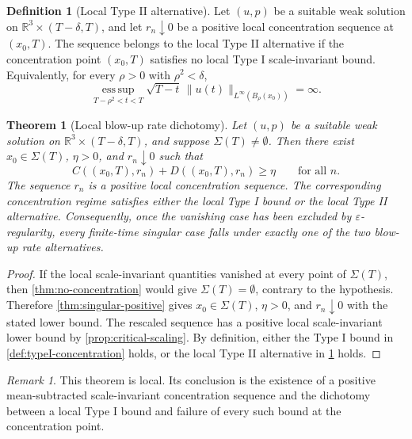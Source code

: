 \documentclass[11pt]{amsart}
\theoremstyle{plain}
\newtheorem{theorem}{Theorem}[section]
\theoremstyle{definition}
\newtheorem{definition}[definition]{Definition}
\theoremstyle{remark}
\newtheorem{remark}[remark]{Remark}
\begin{document}
\begin{definition}[Local Type II alternative]
\label{def:typeII-alternative}
Let \((u,p)\) be a suitable weak solution on
\(\mathbb R^3\times(T-\delta,T)\), and let \(r_n\downarrow0\) be a positive
local concentration sequence at \((x_0,T)\).  The sequence belongs to the local
Type II alternative if the concentration point \((x_0,T)\) satisfies no
local Type I scale-invariant bound.  Equivalently, for every \(\rho>0\) with
\(\rho^2<\delta\),
\[
  \operatorname*{ess\,sup}_{T-\rho^2<t<T}
  \sqrt{T-t}\,\|u(t)\|_{L^\infty(B_\rho(x_0))}=\infty.
\]
\end{definition}

\begin{theorem}[Local blow-up rate dichotomy]\label{thm:typeI-typeII-dichotomy}
Let \((u,p)\) be a suitable weak solution on
\(\mathbb R^3\times(T-\delta,T)\), and suppose \(\Sigma(T)\ne\emptyset\).
Then there exist \(x_0\in\Sigma(T)\),
\(\eta>0\), and \(r_n\downarrow0\) such that
\[
  C((x_0,T),r_n)+D((x_0,T),r_n)\ge\eta
  \qquad\text{for all }n.
\]
The sequence \(r_n\) is a positive local concentration sequence.  The
corresponding concentration regime satisfies either the local Type I bound or
the local Type II alternative.  Consequently, once the vanishing case has been
excluded by \(\varepsilon\)-regularity, every finite-time singular case falls
under exactly one of the two blow-up rate alternatives.
\end{theorem}

\begin{proof}
If the local scale-invariant quantities vanished at every point of
\(\Sigma(T)\), then \cref{thm:no-concentration} would give
\(\Sigma(T)=\emptyset\), contrary to the hypothesis.  Therefore
\cref{thm:singular-positive} gives
\(x_0\in\Sigma(T)\), \(\eta>0\), and \(r_n\downarrow0\) with the stated lower
bound.  The rescaled sequence has a positive local scale-invariant lower bound
by \cref{prop:critical-scaling}.  By definition, either the Type I bound in
\cref{def:typeI-concentration} holds, or the local Type II alternative in
\cref{def:typeII-alternative} holds.
\end{proof}

\begin{remark}
This theorem is local.  Its conclusion is the existence of a positive
mean-subtracted scale-invariant concentration sequence and the dichotomy
between a local Type I bound and failure of every such bound at the
concentration point.
\end{remark}
\end{document}
